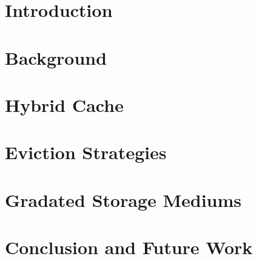 \chapter{Introduction}
\label{chap:Introduction}


\chapter{Background}
\label{chap:Background}


\chapter{Hybrid Cache}
\label{chap:Hybrid_Cache}


\chapter{Eviction Strategies}
\label{chap:Eviction_Strategies}


\chapter{Gradated Storage Mediums}
\label{chap:Storage_Mediums}


\chapter{Conclusion and Future Work}
\label{chap:Conclusion}


